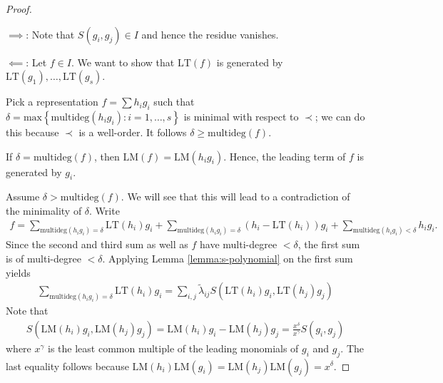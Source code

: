 \documentclass[a4paper, 11pt]{article}
\begin{document}
\begin{proof}
  \(  \)

  \( \implies \): Note that \( S(g_i,g_j) \in I \) and hence the residue vanishes.

  \( \impliedby \): Let \( f \in I \). We want to show that \( \mathrm{LT}(f) \) is generated by \( \mathrm{LT}(g_1), \dots, \mathrm{LT}(g_s) \).

  Pick a representation \( f = \sum h_i g_i \) such that \( \delta = \mathrm{max}\left\{ \mathrm{multideg}(h_ig_i) : i = 1, \dots, s  \right\} \) is minimal with respect to \( \prec \); we can do this because \( \prec \) is a well-order. It follows \( \delta \geq \mathrm{multideg}(f) \).
  
  If \( \delta = \mathrm{multideg}(f) \), then \( \mathrm{LM}(f) = \mathrm{LM}(h_ig_i) \). Hence, the leading term of \( f \) is generated by \( g_i \).

  Assume \( \delta > \mathrm{multideg}(f) \). We will see that this will lead to a contradiction of the minimality of \( \delta \). Write 
  \begin{align*}
    f = \sum_{\mathrm{multideg}(h_ig_i) = \delta} \mathrm{LT}(h_i)g_i +  \sum_{\mathrm{multideg}(h_ig_i) = \delta}  (h_i - \mathrm{LT}(h_i))g_i +  \sum_{\mathrm{multideg}(h_ig_i) < \delta} h_ig_i. 
  \end{align*}
  Since the second and third sum as well as \( f \) have multi-degree \( < \delta \), the first sum is of multi-degree \( < \delta \). Applying Lemma \ref{lemma:s-polynomial} on the first sum yields 
  \begin{align*}
    \sum_{\mathrm{multideg}(h_ig_i) = \delta} \mathrm{LT}(h_i)g_i = \sum_{i,j} \tilde \lambda_{ij}S( \mathrm{LT}(h_i)g_i,  \mathrm{LT}(h_j)g_j)
  \end{align*}
  Note that
  \begin{align*}
    S( \mathrm{LM}(h_i)g_i,  \mathrm{LM}(h_j)g_j) = \mathrm{LM}(h_i)g_i - \mathrm{LM}(h_j)g_j = \frac{x^\delta}{x^\gamma} S(g_i, g_j)
  \end{align*}
  where \( x^\gamma \) is the least common multiple of the leading monomials of \( g_i \) and \( g_j \). The last equality follows because \( \mathrm{LM}(h_i)\mathrm{LM}(g_i) = \mathrm{LM}(h_j)\mathrm{LM}(g_j) = x^\delta \). 
  

\end{proof}
\end{document}
